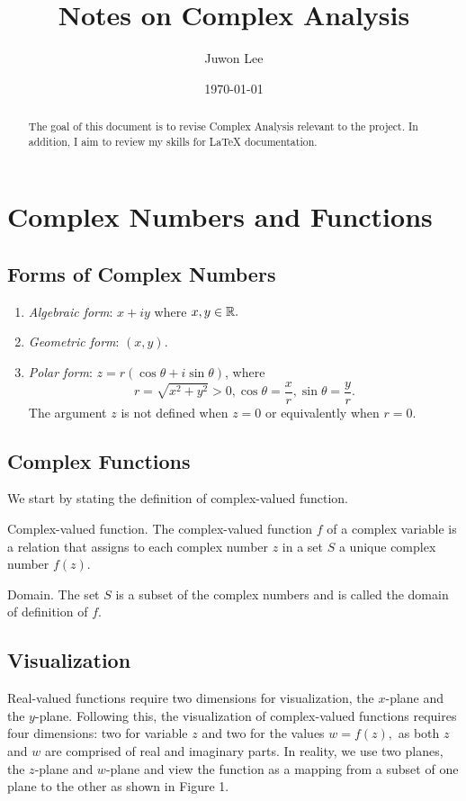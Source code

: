 \documentclass[11pt,reqno,oneside,a4paper]{article}
\author{Juwon Lee}
\title{Notes on Complex Analysis}
\date{\today}
\begin{document}
\maketitle
\thispagestyle{fancy}

\begin{abstract}
The goal of this document is to revise Complex Analysis relevant to the project. 
In addition, I aim to review my skills for LaTeX documentation. 
\end{abstract}

\section{Complex Numbers and Functions}

\subsection{Forms of Complex Numbers}
\begin{enumerate}
	\item \emph{Algebraic form}: $x + iy$ where $x,y \in \mathbb R.$  %
	\item \emph{Geometric form}: $(x,y)$.
	\item \emph{Polar form}: $z =r(\cos\theta + i\sin\theta)$, where $$r = \sqrt{x^2+y^2} > 0, \cos \theta = \frac{x}{r}, \sin \theta = \frac{y}{r}.$$ 
The argument $z$ is not defined when $z=0$ or equivalently when $r=0.$
\end{enumerate}


\subsection{Complex Functions}
We start by stating the definition of complex-valued function.

\begin{defn}{Complex-valued function.}
The complex-valued function $f$ of a complex variable is a relation that assigns to each complex number $z$ in a set $S$ a unique complex number $f(z).$ 
\end{defn}

\begin{defn}{Domain.}
The set $S$ is a subset of the complex numbers and is called the domain of definition of $f.$ 
\end{defn}

\subsection{Visualization}
Real-valued functions require two dimensions for visualization, the $x$-plane and the $y$-plane. 
Following this, the visualization of complex-valued functions requires four dimensions: two for variable $z$ and two for the values $w=f(z),$ as both $z$ and $w$ are comprised of real and imaginary parts. 
In reality, we use two planes, the $z$-plane and $w$-plane and view the function as a mapping from a subset of one plane to the other as shown in Figure 1.
\end{document}
